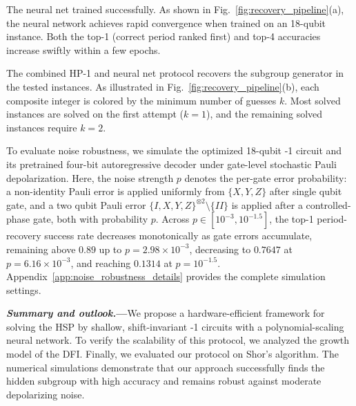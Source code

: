 \documentclass[reprint, aps, prl, superscriptaddress]{revtex4-2}
\newcommand{\rev}[1]{\textcolor{revisioncolor}{#1}}
\renewcommand{\section}[1]{\par\medskip\noindent\textbf{{\textit{#1.}---}}}
\newcommand{\myqc}{\text{HP}}
\begin{document}
The neural net trained successfully. \rev{As shown in Fig.~\ref{fig:recovery_pipeline}(a), the neural network achieves rapid convergence when trained on an 18-qubit instance. Both the top-1 (correct period ranked first) and top-4 accuracies increase swiftly within a few epochs.}

The combined HP-1 and neural net protocol recovers the subgroup generator in the tested instances. As illustrated in Fig.~\ref{fig:recovery_pipeline}(b), each composite integer is colored by the minimum number of guesses $k$. \rev{Most solved instances are solved on the first attempt ($k=1$), and the remaining solved instances require $k=2$. }


\rev{To evaluate noise robustness, we simulate the optimized 18-qubit \myqc-1 circuit and its pretrained four-bit autoregressive decoder under gate-level stochastic Pauli depolarization. Here, the noise strength $p$ denotes the per-gate error probability: a non-identity Pauli error is applied uniformly from $\{X, Y, Z\}$ after single qubit gate, and a two qubit Pauli error $\{I, X, Y, Z\}^{\otimes 2}\setminus\{II\}$ is applied after a controlled-phase gate, both with probability $p$. Across $p\in[10^{-3},10^{-1.5}]$, the top-1 period-recovery success rate decreases monotonically as gate errors accumulate, remaining above $0.89$ up to $p=2.98\times10^{-3}$, decreasing to $0.7647$ at $p=6.16\times10^{-3}$, and reaching $0.1314$ at $p=10^{-1.5}$. Appendix~\ref{app:noise_robustness_details} provides the complete simulation settings.}

\section{Summary and outlook}We propose a hardware-efficient framework for solving the HSP by shallow, shift-invariant \myqc{}-1 circuits with a polynomial-scaling neural network. To verify the scalability of this protocol, we analyzed the growth model of the DFI. Finally, we evaluated our protocol on Shor's algorithm. The numerical simulations demonstrate that our approach successfully finds the hidden subgroup with high accuracy and remains robust against moderate depolarizing noise.
\end{document}
